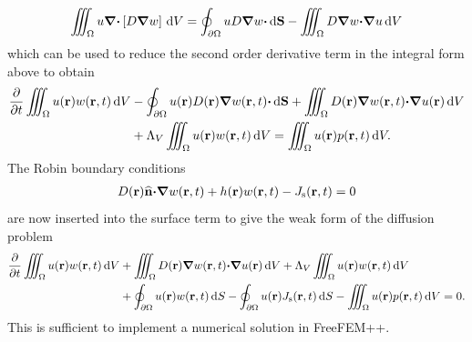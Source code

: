 \documentclass[a4paper]{article}
\numberwithin{equation}{section}
\providecommand\oiint{\oint}
\begin{document}
\begin{align}
\iiint_{\Omega} u{\vnabla}{\vcdot}\left[D{\vnabla}w\right]\dif{V}
=\oiint_{\partial\Omega } uD{\vnabla}w{\vcdot}\dif{\vS}
-\iiint_{\Omega} D{\vnabla}w{\vcdot}{\vnabla}u\dif{V}
\end{align}
which can be used to reduce the second order derivative term in the integral form above to obtain
\begin{align}
\frac{{\partial}}{{\partial}t}\iiint_{\Omega} u\pr w\prt\dif{V}
&-\oiint_{\partial\Omega} u\pr D\pr {\vnabla}w\prt{\vcdot}\dif{\vS}
+\iiint_{\Omega} D\pr{\vnabla}w\prt{\vcdot}{\vnabla}u\pr\dif{V} \nonumber\\
&+\Lambda_V \iiint_{\Omega} u\pr w\prt\dif{V}
=\iiint_{\Omega} u\pr p\prt\dif{V}.
\end{align}
The Robin boundary conditions
\begin{align}
D(\boldsymbol{\mathrm{r}})\widehat{\boldsymbol{\mathrm{n}}}{\boldsymbol{\mathrm{\cdot}}}{\boldsymbol{\mathrm{\nabla}}} w(\boldsymbol{\mathrm{r}},t) +h(\boldsymbol{\mathrm{r}}) w(\boldsymbol{\mathrm{r}},t)-J_{\mathrm{s}}(\boldsymbol{\mathrm{r}},t)=0
\end{align}
are now inserted into the surface term to give the weak form of the diffusion
problem
\begin{align}
\frac{{\partial}}{{\partial}t}\iiint_{\Omega} u\pr w\prt\dif{V}
&+\iiint_{\Omega} D\pr{\vnabla}w\prt{\vcdot}{\vnabla}u\pr\dif{V}
+\Lambda_V \iiint_{\Omega} u\pr w\prt\dif{V} \nonumber \\
&+\oiint_{\partial\Omega} u\pr w\prt\dif{S}
-\oiint_{\partial\Omega} u\pr J_\rs\prt\dif{S}
-\iiint_{\Omega} u\pr p\prt\dif{V}=0.
\end{align}
This is sufficient to implement a numerical solution in FreeFEM++. 
\end{document}
